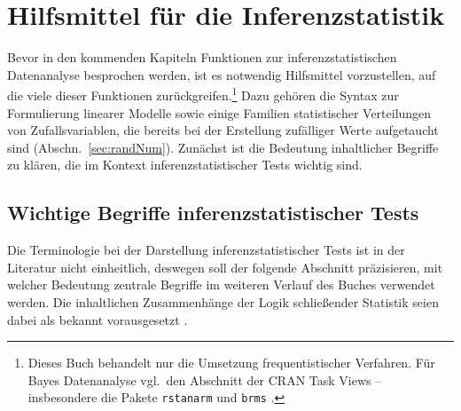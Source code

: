 \chapter{Hilfsmittel für die Inferenzstatistik}
\label{sec:prepStat}

Bevor in den kommenden Kapiteln Funktionen zur inferenzstatistischen Datenanalyse besprochen werden, ist es notwendig Hilfsmittel vorzustellen, auf die viele dieser Funktionen zurückgreifen.\footnote{Dieses Buch behandelt nur die Umsetzung frequentistischer Verfahren. Für Bayes Datenanalyse \cite{Kruschke2015,McElreath2015} vgl.\ den Abschnitt  der CRAN Task Views \cite{CRANtvBayes} -- insbesondere die Pakete \lstinline!rstanarm! \cite{Gabry2016} und \lstinline!brms! \cite{Buerkner2016}.} Dazu gehören die Syntax zur Formulierung linearer Modelle sowie einige Familien statistischer Verteilungen von Zufallsvariablen, die bereits bei der Erstellung zufälliger Werte aufgetaucht sind (Abschn.\ \ref{sec:randNum}). Zunächst ist die Bedeutung inhaltlicher Begriffe zu klären, die im Kontext inferenzstatistischer Tests wichtig sind.

\section{Wichtige Begriffe inferenzstatistischer Tests}
\label{sec:infStatDef}

Die Terminologie bei der Darstellung inferenzstatistischer Tests ist in der Literatur nicht einheitlich, deswegen soll der folgende Abschnitt präzisieren, mit welcher Bedeutung zentrale Begriffe im weiteren Verlauf des Buches verwendet werden. Die inhaltlichen Zusammenhänge der Logik schließender Statistik seien dabei als bekannt vorausgesetzt \cite{Eid2010}.

